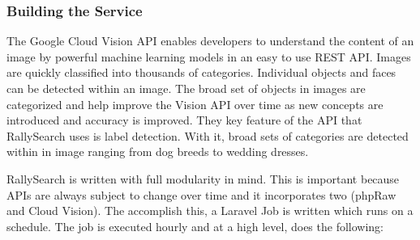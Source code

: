\documentclass[msc,oneside]{ubcthesis}%
\begin{document}
\subsubsection{Building the Service}
The Google Cloud Vision API enables developers to understand the content of an image by powerful machine learning models in an easy to use REST API. Images are quickly classified into thousands of categories. Individual objects and faces can be detected within an image. The broad set of objects in images are categorized and help improve the Vision API over time as new concepts are introduced and accuracy is improved. They key feature of the API that RallySearch uses is label detection. With it, broad sets of categories are detected within in image ranging from dog breeds to wedding dresses.
\par
RallySearch is written with full modularity in mind. This is important because APIs are always subject to change over time and it incorporates two (phpRaw and Cloud Vision). The accomplish this, a Laravel Job is written which runs on a schedule. The job is executed hourly and at a high level, does the following:
\end{document}
